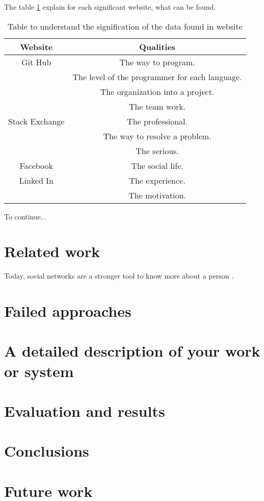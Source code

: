 \documentclass{article}
\begin{document}
  The table \ref{table:1} explain for each significant website, what can be found. 

\begin{table}[h!]
\centering
 \begin{tabular}{|c | c|} 
 \hline
 Website & Qualities \\ [0.5ex] 
 \hline\hline
 Git Hub & The way to program. \\ & The level of the programmer for each  language. \\ & The organization into a project. \\ & The team work. \\
 \hline
 Stack Exchange & The professional. \\ & The way to resolve a problem. \\ &  The serious.  \\
 \hline
 Facebook & The social life. \\
 \hline
 Linked In & The experience. \\ & The motivation.\\
 \hline
 \end{tabular}
 \caption{Table to understand the signification of the data found in website}
 \label{table:1}
\end{table} \par

To continue...

\section{Related work}
Today, social networks are a stronger tool to know more about a person \cite{mining}.


\section{Failed approaches}

\section{A detailed description of your work or system}

\section{Evaluation and results}

\section{Conclusions}

\section{Future work}

\printbibliography
\end{document}
